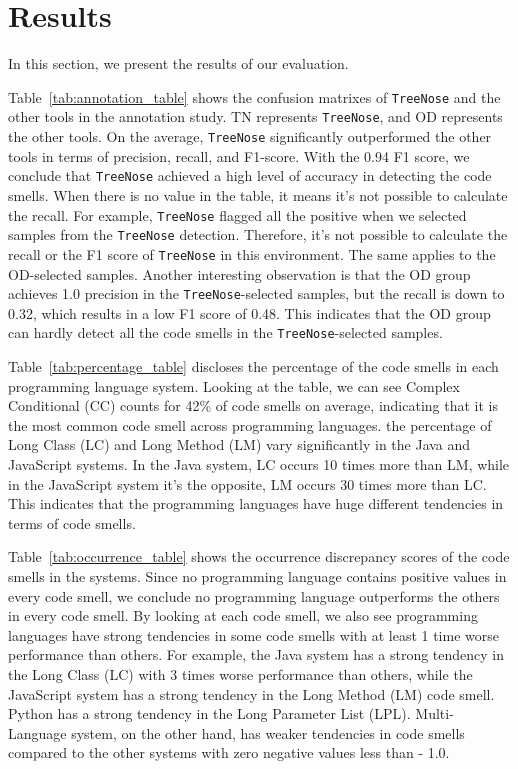

\section{Results}
\label{sec:results}

In this section, we present the results of our evaluation.


Table~\ref{tab:annotation_table} shows the confusion matrixes of \texttt{TreeNose} and the other tools in the annotation study. TN represents \texttt{TreeNose}, and OD represents the other tools.
On the average, \texttt{TreeNose} significantly outperformed the other tools in terms of precision, recall, and F1-score.
With the 0.94 F1 score, we conclude that \texttt{TreeNose} achieved a high level of accuracy in detecting the code smells.
When there is no value in the table, it means it's not possible to calculate the recall. For example, 
\texttt{TreeNose} flagged all the positive when we selected samples from the \texttt{TreeNose} detection. Therefore, it's not
possible to calculate the recall or the F1 score of \texttt{TreeNose} in this environment. The same applies to the OD-selected samples.
Another interesting observation is that the OD group achieves 1.0 precision in the \texttt{TreeNose}-selected samples, but the recall is down to 0.32,
which results in a low F1 score of 0.48. This indicates that the OD group can hardly detect all the code smells in the \texttt{TreeNose}-selected samples.

Table~\ref{tab:percentage_table} discloses the percentage of the code smells in each programming language system. Looking at the table, we can see Complex Conditional (CC)
counts for 42\% of code smells on average, indicating that it is the most common code smell across programming languages. 
the percentage of Long Class (LC) and Long Method (LM) vary significantly in the Java and JavaScript systems. In the Java system,
LC occurs 10 times more than LM, while in the JavaScript system it's the opposite, LM occurs 30 times more than LC. 
This indicates that the programming languages have huge different tendencies in terms of code smells.



Table~\ref{tab:occurrence_table} shows the occurrence discrepancy scores of the code smells in the systems. Since no programming language contains positive values in every code smell, 
we conclude no programming language outperforms the others in every code smell.
By looking at each code smell, we also see programming languages have strong tendencies in some code smells with at least 1 time worse performance than others. 
For example, the Java system has a strong tendency in the Long Class (LC) with 3 times worse performance than others, 
while the JavaScript system has a strong tendency in the Long Method (LM) code smell. Python has a strong tendency in the Long Parameter List (LPL).
Multi-Language system, on the other hand, has weaker tendencies in code smells compared to the other systems with zero negative values less than - 1.0.

